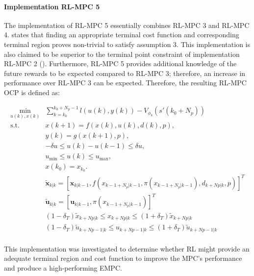 \paragraph{Implementation RL-MPC 5}
The implementation of RL-MPC 5 essentially combines RL-MPC 3 and RL-MPC 4. \citet{amritEconomicOptimizationUsing2011} states that finding an appropriate terminal cost function and corresponding terminal region proves non-trivial  to satisfy assumption 3. This implementation is also claimed to be superior to the terminal point constraint of implementation RL-MPC 2 (\cite{amritEconomicOptimizationUsing2011}). Furthermore, RL-MPC 5 provides additional knowledge of the future rewards to be expected compared to RL-MPC 3; therefore, an increase in performance over RL-MPC 3 can be expected. Therefore, the resulting RL-MPC OCP is defined as:

\begin{subequations} \label{eq:rl-mpc-ocp}
	\begin{align}
		\min_{u(k),x(k)} & \sum_{k = k_0}^{k_0 + N_p-1} {l(u(k), y(k))} - V_{\phi_4}(s'(k_0+N_p)) \\
		\text{s.t.} \quad & x(k+1) = f(x(k), u(k), d(k), p),  \label{eq:rl-mpc-dynamics-constraint} \\
		& y(k) = g(x(k+1), p), \label{eq:rl-mpc-output-constraint} \\
		& -\delta u \leq u(k) - u(k-1) \leq \delta u, \label{eq:rl-mpc-delta-u} \\
		& u_{\min} \leq u(k) \leq u_{\max}, \label{eq:rl-mpc-u-limits}\\
		& x(k_0) = x_{k_0}. \label{eq:rl-pmc-initial} \\
 		&\tilde{\mathbf{x}}_{k|k} = [\mathbf{x}_{k|k-1},f(x_{k-1 + N_p|k-1}, \pi(x_{k-1 + N_p|k-1}), d_{k+Np|k},p)]^T\\ 
		&\tilde{\mathbf{u}}_{k|k} = [\mathbf{u}_{k|k-1},\pi(x_{k-1 + N_p|k-1})]^T\\
		& (1-\delta_T)\tilde{x}_{k+Np|k} \leq x_{k+Np|k} \leq (1+\delta_T)\tilde{x}_{k+Np|k}\\
		&(1-\delta_T)\tilde{u}_{k+Np-1|k} \leq u_{k+Np-1|k} \leq (1+\delta_T) \tilde{u}_{k+Np-1|k}\\
	\end{align}
\end{subequations}

This implementation was investigated to determine whether RL might provide an adequate terminal region and cost function to improve the MPC's performance and produce a high-performing EMPC. 


